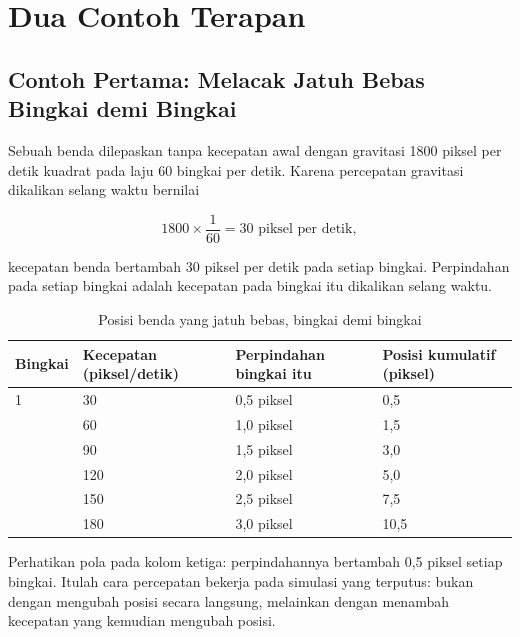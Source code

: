 \section{Dua Contoh Terapan}
\label{sec:contoh-bab-6}

\subsection{Contoh Pertama: Melacak Jatuh Bebas Bingkai demi Bingkai}

\begin{contohbox}
Sebuah benda dilepaskan tanpa kecepatan awal dengan gravitasi 1800 piksel per
detik kuadrat pada laju 60 bingkai per detik. Karena percepatan gravitasi
dikalikan selang waktu bernilai

\[
1800 \times \frac{1}{60} = 30 \text{ piksel per detik},
\]

kecepatan benda bertambah 30 piksel per detik pada setiap bingkai. Perpindahan
pada setiap bingkai adalah kecepatan pada bingkai itu dikalikan selang waktu.
\end{contohbox}

\begin{table}[htbp]
\centering
\caption{Posisi benda yang jatuh bebas, bingkai demi bingkai}
\label{tab:jatuh-bebas}
{\setlength{\tabcolsep}{4pt}\footnotesize%
\begin{tabularx}{\textwidth}{@{}C{1.6cm} C{3.0cm} C{3.4cm} Y@{}}
\toprule
\headrow \textbf{Bingkai} & \textbf{Kecepatan (piksel/detik)} & \textbf{Perpindahan bingkai itu} & \textbf{Posisi kumulatif (piksel)} \\
 & 30 & 0,5 piksel & 0,5 \\
 & 60 & 1,0 piksel & 1,5 \\
 & 90 & 1,5 piksel & 3,0 \\
 & 120 & 2,0 piksel & 5,0 \\
 & 150 & 2,5 piksel & 7,5 \\
 & 180 & 3,0 piksel & 10,5 \\
\bottomrule
\end{tabularx}}
\end{table}

Perhatikan pola pada kolom ketiga: perpindahannya bertambah 0,5 piksel setiap
bingkai. Itulah cara percepatan bekerja pada simulasi yang terputus: bukan
dengan mengubah posisi secara langsung, melainkan dengan menambah kecepatan
yang kemudian mengubah posisi.

